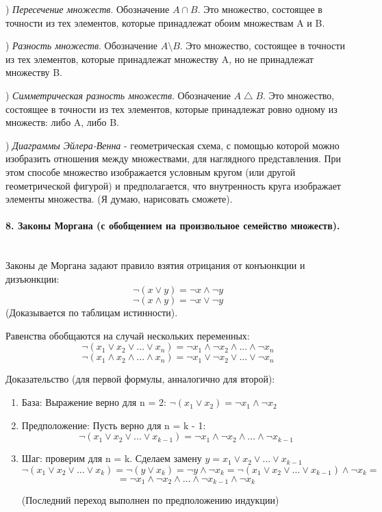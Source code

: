 \documentclass[a4paper, 12pt]{article}
\newcommand{\parag}[1]{\paragraph{#1}\mbox{}\\}
\begin{document}
) \textit{Пересечение множеств}. Обозначение $A \cap B$. Это множество, состоящее в точности из тех элементов, которые принадлежат обоим множествам A и B.

) \textit{Разность множеств}. Обозначение $A \setminus B$. Это множество, состоящее в точности
из тех элементов, которые принадлежат множеству A, но не принадлежат множеству B.

) \textit{Симметрическая разность множеств}. Обозначение $A \bigtriangleup B$. Это множество, состоящее в точности из тех элементов, которые принадлежат ровно одному из множеств:
либо A, либо B.

) \textit{Диаграммы Эйлера-Венна} - геометрическая схема, с помощью которой можно изобразить отношения между множествами, для наглядного представления. При этом способе множество изображается условным кругом (или
другой геометрической фигурой) и предполагается, что внутренность круга изображает элементы множества. (Я думаю, нарисовать сможете).

\parag{8. Законы Моргана (с обобщением на произвольное семейство множеств).}
Законы де Моргана задают правило взятия отрицания от конъюнкции и дизъюнкции:
\[ \neg(x \vee y) = \neg x \wedge \neg y \]
\[ \neg(x \wedge y) = \neg x \vee \neg y \]
(Доказывается по таблицам истинности).

\noindent
Равенства обобщаются на случай нескольких переменных:
\[ \neg(x_{1} \vee x_{2} \vee ... \vee x_{n}) = \neg x_{1} \wedge \neg x_{2} \wedge ... \wedge \neg x_{n} \]
\[ \neg(x_{1} \wedge x_{2} \wedge ... \wedge x_{n}) = \neg x_{1} \vee \neg x_{2} \vee ... \vee \neg x_{n} \]

\noindent
Доказательство (для первой формулы, анналогично для второй):

\begin{enumerate}
    \item База: Выражение верно для n = 2: $\neg(x_{1}  \vee x_{2}) = \neg x_{1} \wedge \neg x_{2}$
    \item Предположение: Пусть верно для n = k - 1: \[ \neg(x_{1} \vee x_{2} \vee ... \vee x_{k - 1}) = \neg x_{1} \wedge \neg x_{2} \wedge ... \wedge \neg x_{k - 1} \]
    \item Шаг: проверим для n = k. Сделаем замену $y = x_{1} \vee x_{2} \vee ... \vee x_{k - 1}$
        $$ \neg(x_{1} \vee x_{2} \vee ... \vee x_{k}) = \neg(y \vee x_{k}) = \neg y \wedge \neg x_{k} = \neg (x_{1} \vee x_{2} \vee ... \vee x_{k - 1}) \wedge \neg x_{k} = $$
        $$= \neg x_{1} \wedge \neg x_{2} \wedge ... \wedge \neg x_{k - 1} \wedge \neg x_{k}$$
        
        (Последний переход выполнен по предположению индукции)
\end{enumerate}  
\end{document}
